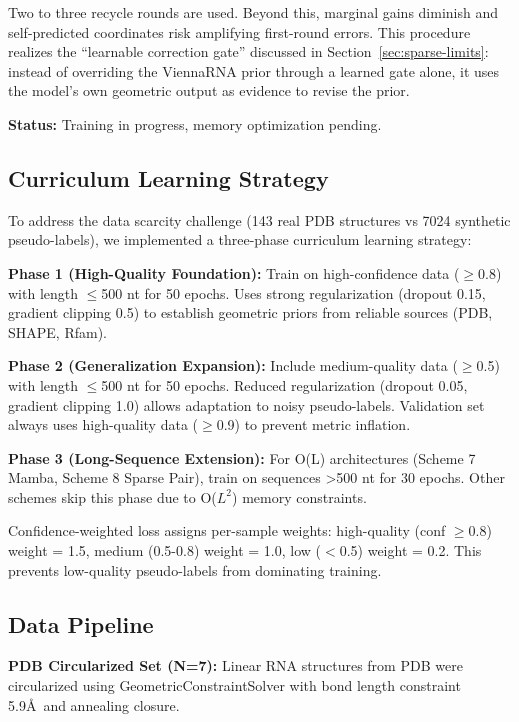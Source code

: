 \documentclass[12pt]{article}
\begin{document}
Two to three recycle rounds are used. Beyond this, marginal gains diminish and self-predicted coordinates risk amplifying first-round errors. This procedure realizes the ``learnable correction gate'' discussed in Section~\ref{sec:sparse-limits}: instead of overriding the ViennaRNA prior through a learned gate alone, it uses the model's own geometric output as evidence to revise the prior.

\textbf{Status:} Training in progress, memory optimization pending.

\subsection{Curriculum Learning Strategy}

To address the data scarcity challenge (143 real PDB structures vs 7024 synthetic pseudo-labels), we implemented a three-phase curriculum learning strategy:

\textbf{Phase 1 (High-Quality Foundation):} Train on high-confidence data ($\geq$0.8) with length $\leq$500 nt for 50 epochs. Uses strong regularization (dropout 0.15, gradient clipping 0.5) to establish geometric priors from reliable sources (PDB, SHAPE, Rfam).

\textbf{Phase 2 (Generalization Expansion):} Include medium-quality data ($\geq$0.5) with length $\leq$500 nt for 50 epochs. Reduced regularization (dropout 0.05, gradient clipping 1.0) allows adaptation to noisy pseudo-labels. Validation set always uses high-quality data ($\geq$0.9) to prevent metric inflation.

\textbf{Phase 3 (Long-Sequence Extension):} For O(L) architectures (Scheme 7 Mamba, Scheme 8 Sparse Pair), train on sequences >500 nt for 30 epochs. Other schemes skip this phase due to O($L^2$) memory constraints.

Confidence-weighted loss assigns per-sample weights: high-quality (conf $\geq$0.8) weight = 1.5, medium (0.5-0.8) weight = 1.0, low ($<$0.5) weight = 0.2. This prevents low-quality pseudo-labels from dominating training.

\subsection{Data Pipeline}

\textbf{PDB Circularized Set (N=7):} Linear RNA structures from PDB were circularized using GeometricConstraintSolver with bond length constraint 5.9\AA\ and annealing closure.
\end{document}
